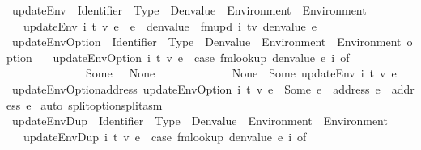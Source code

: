 \begin{isabellebody}
\ updateEnv\ {\isacharcolon}{\kern0pt}{\isacharcolon}{\kern0pt}\ {\isachardoublequoteopen}Identifier\ {\isasymRightarrow}\ Type\ {\isasymRightarrow}\ Denvalue\ {\isasymRightarrow}\ Environment\ {\isasymRightarrow}\ Environment{\isachardoublequoteclose}\isanewline
\ \ \ {\isachardoublequoteopen}updateEnv\ i\ t\ v\ e\ {\isacharequal}{\kern0pt}\ e\ {\isasymlparr}\ denvalue\ {\isacharcolon}{\kern0pt}{\isacharequal}{\kern0pt}\ fmupd\ i\ {\isacharparenleft}{\kern0pt}t{\isacharcomma}{\kern0pt}v{\isacharparenright}{\kern0pt}\ {\isacharparenleft}{\kern0pt}denvalue\ e{\isacharparenright}{\kern0pt}\ {\isasymrparr}{\isachardoublequoteclose}\isanewline
\isanewline
{}\isamarkupfalse%
\ updateEnvOption\ {\isacharcolon}{\kern0pt}{\isacharcolon}{\kern0pt}\ {\isachardoublequoteopen}Identifier\ {\isasymRightarrow}\ Type\ {\isasymRightarrow}\ Denvalue\ {\isasymRightarrow}\ Environment\ {\isasymRightarrow}\ Environment\ option{\isachardoublequoteclose}\isanewline
\ \ \ {\isachardoublequoteopen}updateEnvOption\ i\ t\ v\ e\ {\isacharequal}{\kern0pt}\ {\isacharparenleft}{\kern0pt}case\ fmlookup\ {\isacharparenleft}{\kern0pt}denvalue\ e{\isacharparenright}{\kern0pt}\ i\ of\ \isanewline
\ \ \ \ \ \ \ \ \ \ \ \ \ \ Some\ {\isacharunderscore}{\kern0pt}\ {\isasymRightarrow}\ None\isanewline
\ \ \ \ \ \ \ \ \ \ \ \ {\isacharbar}{\kern0pt}\ None\ {\isasymRightarrow}\ Some\ {\isacharparenleft}{\kern0pt}updateEnv\ i\ t\ v\ e{\isacharparenright}{\kern0pt}{\isacharparenright}{\kern0pt}{\isachardoublequoteclose}\isanewline
\isanewline
{}\isamarkupfalse%
\ updateEnvOption{\isacharunderscore}{\kern0pt}address{\isacharcolon}{\kern0pt}\ {\isachardoublequoteopen}updateEnvOption\ i\ t\ v\ e\ {\isacharequal}{\kern0pt}\ Some\ e{\isacharprime}{\kern0pt}\ {\isasymLongrightarrow}\ address\ e\ {\isacharequal}{\kern0pt}\ address\ e{\isacharprime}{\kern0pt}{\isachardoublequoteclose}\isanewline
%
\isadelimproof
%
\endisadelimproof
%
\isatagproof
{}\isamarkupfalse%
\ {\isacharparenleft}{\kern0pt}auto\ split{\isacharcolon}{\kern0pt}option{\isachardot}{\kern0pt}split{\isacharunderscore}{\kern0pt}asm{\isacharparenright}{\kern0pt}%
\endisatagproof
{\isafoldproof}%
%
\isadelimproof
\isanewline
%
\endisadelimproof
\isanewline
{}\isamarkupfalse%
\ updateEnvDup\ {\isacharcolon}{\kern0pt}{\isacharcolon}{\kern0pt}\ {\isachardoublequoteopen}Identifier\ {\isasymRightarrow}\ Type\ {\isasymRightarrow}\ Denvalue\ {\isasymRightarrow}\ Environment\ {\isasymRightarrow}\ Environment{\isachardoublequoteclose}\isanewline
\ \ \ {\isachardoublequoteopen}updateEnvDup\ i\ t\ v\ e\ {\isacharequal}{\kern0pt}\ {\isacharparenleft}{\kern0pt}case\ fmlookup\ {\isacharparenleft}{\kern0pt}denvalue\ e{\isacharparenright}{\kern0pt}\ i\ of\ \isanewline

\end{isabellebody}
